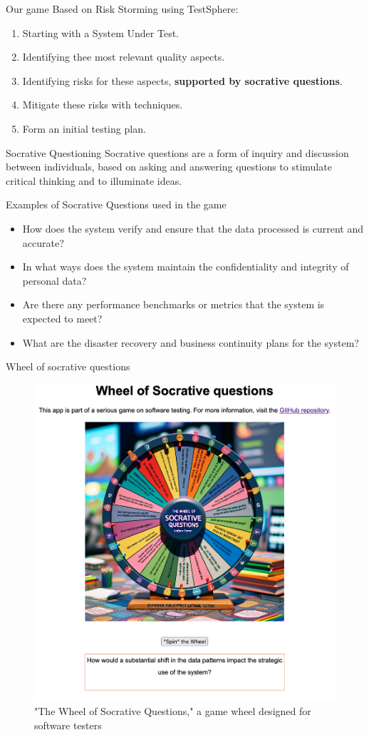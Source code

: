 \documentclass[aspectratio=169]{beamer}
\begin{document}
\begin{frame}{Our game}
    Based on Risk Storming using TestSphere:
    \begin{enumerate}
        \item Starting with a System Under Test.
        \item Identifying thee most relevant quality aspects.
        \item Identifying risks for these aspects, \textbf{supported by socrative questions}.
        \item Mitigate these risks with techniques.
        \item Form an initial testing plan.
    \end{enumerate}
\end{frame}

\begin{frame}{Socrative Questioning}
    Socrative questions are a form of inquiry and discussion between individuals, based on asking and answering questions to stimulate critical thinking and to illuminate ideas.
\end{frame}

\begin{frame}{Examples of Socrative Questions used in the game}
    \begin{itemize}
        \item How does the system verify and ensure that the data processed is current and accurate?
        \item In what ways does the system maintain the confidentiality and integrity of personal data?
        \item Are there any performance benchmarks or metrics that the system is expected to meet?
        \item What are the disaster recovery and business continuity plans for the system?
    \end{itemize}
\end{frame}

\begin{frame}{Wheel of socrative questions}
    \begin{figure}
        \centering
        \includegraphics[width=0.5\linewidth]{images//wheel}
        \caption{"The Wheel of Socrative Questions," a game wheel designed for software testers}
    \end{figure}
\end{frame}
\end{document}
